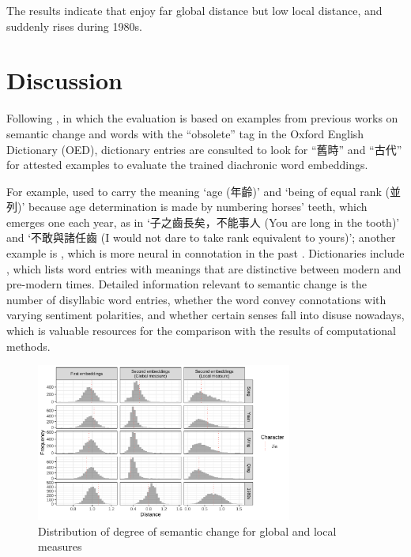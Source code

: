 The results indicate that \jia enjoy far global distance but low local distance, and suddenly rises during 1980s.






\section{Discussion}
Following \textcite{hamilton2016law}, in which the evaluation is based on examples from previous works on semantic change and words with the ``obsolete'' tag in the Oxford English Dictionary (OED), dictionary entries are consulted to look for ``舊時'' and ``古代'' for attested examples to evaluate the trained diachronic word embeddings.

For example,  used to carry the meaning `age (年齡)' and `being of equal rank (並列)' because age determination is made by numbering horses' teeth, which emerges one each year, as in `子之齒長矣，不能事人 (You are long in the tooth)' and `不敢與諸任齒 (I would not dare to take rank equivalent to yours)'; another example is , which is more neural in connotation in the past \parencite[前言]{wang1997gujinyiyi}. Dictionaries include \textcite{wang1997gujinyiyi,liu1992gujinyi}, which lists word entries with meanings that are distinctive between modern and pre-modern times. Detailed information relevant to semantic change is the number of disyllabic word entries, whether the word convey connotations with varying sentiment polarities, and whether certain senses fall into disuse nowadays, which is valuable resources for the comparison with the results of computational methods. 

\begin{figure}[H]
  \centering
  \includegraphics[width=0.75\textwidth,keepaspectratio]{figures_new/measures/dist_hist_w5.pdf}
  \caption{Distribution of degree of semantic change for global and local measures}
\end{figure}

